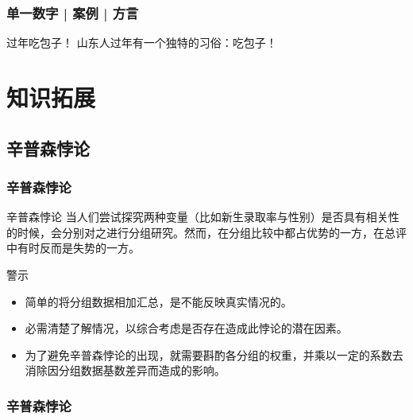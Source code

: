 \begin{frame}
  \frametitle{单一数字 | 案例 | 方言}
  \begin{block}{过年吃包子！}
    山东人过年有一个独特的习俗：吃包子！
  \end{block}
  \begin{figure}
    \centering
  \end{figure}
\end{frame}

\section{知识拓展}
\subsection{辛普森悖论}
\begin{frame}
  \frametitle{辛普森悖论}
  \begin{block}{辛普森悖论}
当人们尝试探究两种变量（比如新生录取率与性别）是否具有相关性的时候，会分别对之进行分组研究。然而，在分组比较中都占优势的一方，在总评中有时反而是失势的一方。
  \end{block}
  \pause
  \begin{block}{警示}
    \begin{itemize}
      \item 简单的将分组数据相加汇总，是不能反映真实情况的。
      \item 必需清楚了解情况，以综合考虑是否存在造成此悖论的潜在因素。
      \item 为了避免辛普森悖论的出现，就需要斟酌各分组的权重，并乘以一定的系数去消除因分组数据基数差异而造成的影响。
    \end{itemize}
  \end{block}
\end{frame}

\begin{frame}
  \frametitle{辛普森悖论}
  \begin{figure}
    \centering
    \\
    \vspace{0.5em}
    \\
    \vspace{0.5em}
  \end{figure}
\end{frame}

